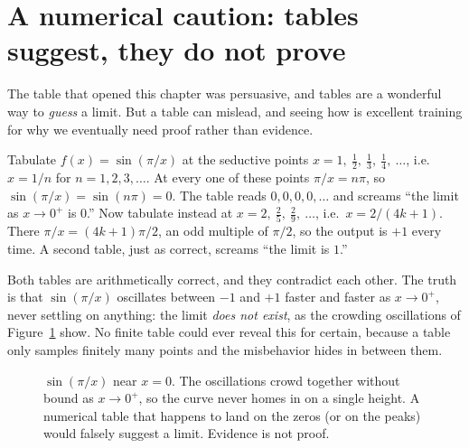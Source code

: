 \section{A numerical caution: tables suggest, they do not prove}

The table that opened this chapter was persuasive, and tables are a wonderful way to \emph{guess}
a limit. But a table can mislead, and seeing how is excellent training for why we eventually need
proof rather than evidence.

\begin{labbox}
Tabulate $f(x) = \sin(\pi/x)$ at the seductive points $x = 1,\ \tfrac{1}{2},\ \tfrac{1}{3},\
\tfrac{1}{4},\ \dots$, i.e.\ $x = 1/n$ for $n=1,2,3,\dots$. At every one of these points $\pi/x =
n\pi$, so $\sin(\pi/x) = \sin(n\pi) = 0$. The table reads $0,0,0,0,\dots$ and screams ``the limit
as $x\to 0^+$ is $0$.'' Now tabulate instead at $x = 2,\ \tfrac{2}{5},\ \tfrac{2}{9},\ \dots$,
i.e.\ $x = 2/(4k+1)$. There $\pi/x = (4k+1)\pi/2$, an odd multiple of $\pi/2$, so the output is
$+1$ every time. A second table, just as correct, screams ``the limit is $1$.''
\end{labbox}

Both tables are arithmetically correct, and they contradict each other. The truth is that
$\sin(\pi/x)$ oscillates between $-1$ and $+1$ faster and faster as $x \to 0^+$, never settling
on anything: the limit \emph{does not exist}, as the crowding oscillations of
Figure~\ref{ch05:oscillation} show. No finite table could ever reveal this for certain,
because a table only samples finitely many points and the misbehavior hides in between them.

\begin{figure}[H]
\centering
{}
\caption{$\sin(\pi/x)$ near $x=0$. The oscillations crowd together without bound as $x\to 0^+$,
so the curve never homes in on a single height. A numerical table that happens to land on the
zeros (or on the peaks) would falsely suggest a limit. Evidence is not proof.}
\label{ch05:oscillation}
\end{figure}

